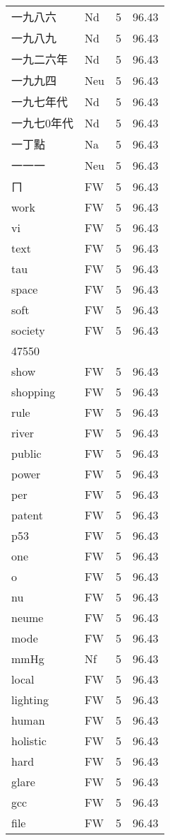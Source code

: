 \documentclass[twocolumn]{book}
\begin{document}
\begin{supertabular}{llrr}
一九八六 & Nd & 5 &  96.43\\
一九八九 & Nd & 5 &  96.43\\
一九二六年 & Nd & 5 &  96.43\\
一九九四 & Neu & 5 &  96.43\\
一九七年代 & Nd & 5 &  96.43\\
一九七0年代 & Nd & 5 &  96.43\\
一丁點 & Na & 5 &  96.43\\
一一一 & Neu & 5 &  96.43\\
ㄇ & FW & 5 &  96.43\\
work & FW & 5 &  96.43\\
vi & FW & 5 &  96.43\\
text & FW & 5 &  96.43\\
tau & FW & 5 &  96.43\\
space & FW & 5 &  96.43\\
soft & FW & 5 &  96.43\\
society & FW & 5 &  96.43\\
47550\\
show & FW & 5 &  96.43\\
shopping & FW & 5 &  96.43\\
rule & FW & 5 &  96.43\\
river & FW & 5 &  96.43\\
public & FW & 5 &  96.43\\
power & FW & 5 &  96.43\\
per & FW & 5 &  96.43\\
patent & FW & 5 &  96.43\\
p53 & FW & 5 &  96.43\\
one & FW & 5 &  96.43\\
o & FW & 5 &  96.43\\
nu & FW & 5 &  96.43\\
neume & FW & 5 &  96.43\\
mode & FW & 5 &  96.43\\
mmHg & Nf & 5 &  96.43\\
local & FW & 5 &  96.43\\
lighting & FW & 5 &  96.43\\
human & FW & 5 &  96.43\\
holistic & FW & 5 &  96.43\\
hard & FW & 5 &  96.43\\
glare & FW & 5 &  96.43\\
gcc & FW & 5 &  96.43\\
file & FW & 5 &  96.43\\

\end{supertabular}
\end{document}
